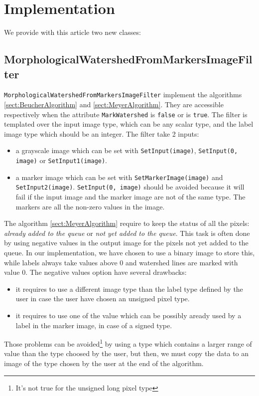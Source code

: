 \documentclass{InsightArticle}
\begin{document}
\section{Implementation}
\label{sect:implementation}

We provide with this article two new classes:

  \subsection{MorphologicalWatershedFromMarkersImageFilter}

\verb$MorphologicalWatershedFromMarkersImageFilter$ implement the
algorithms \ref{sect:BeucherAlgorithm} and \ref{sect:MeyerAlgorithm}.
They are accessible respectively when the attribute \verb$MarkWatershed$
is \verb$false$ or is \verb$true$. The filter is templated over the
input image type, which can be any scalar type, and the label image type
which should be an integer. The filter take 2 inputs:
\begin{itemize}
  \item a grayscale image which can be set with \verb$SetInput(image)$,
\verb$SetInput(0, image)$ or \verb$SetInput1(image)$.
  \item a marker image which can be set with \verb$SetMarkerImage(image)$
and \verb$SetInput2(image)$. \verb$SetInput(0, image)$ should be avoided
because it will fail if the input image and the marker image are not of the
same type. The markers are all the non-zero values in the image.
\end{itemize}

The algorithm \ref{sect:MeyerAlgorithm} require to keep the status of all
the pixels: {\em already added to the queue} or {\em not yet added to the queue}.
This task is often done by using negative values in the output image
for the pixels not yet added to the queue. In our implementation, we have
chosen to use a binary image to store this, while labels always take values
above 0 and watershed lines are marked with value 0. The negative values
option have several drawbacks:
\begin{itemize}
  \item it requires to use a different image type than the label type defined
by the user in case the user have chosen an unsigned pixel type.
  \item it requires to use one of the value which can be possibly aready used
by a label in the marker image, in case of a signed type.
\end{itemize}
Those problems can be avoided\footnote{It's not true for the unsigned long
pixel type} by using a type which contains a larger range of value than the
type choosed by the user, but then, we must copy the data to an image of
the type chosen by the user at the end of the algorithm.
\end{document}
